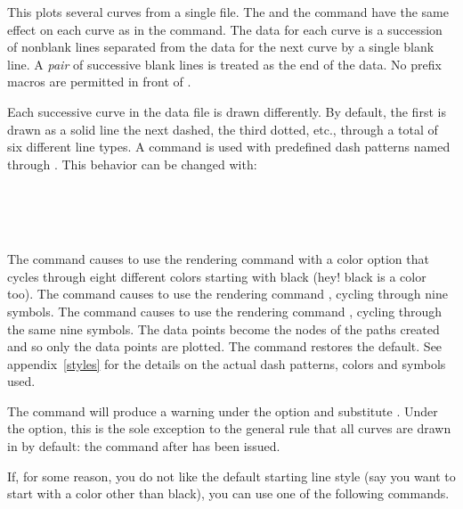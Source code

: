 \documentclass[letterpaper]{article}
\begin{document}
This plots several curves from a single file. The  and the
command  have the same effect on each curve as in the
 command. The data for each curve is a succession of
nonblank lines separated from the data for the next curve by a single
blank line. A \emph{pair} of successive blank lines is treated as the
end of the data. No prefix macros are permitted in front of
.

Each successive curve in the data file is drawn differently. By default,
the first is drawn as a solid line the next dashed, the third dotted,
etc., through a total of six different line types. A 
command is used with predefined dash patterns named 
through . This behavior can be changed with:

\begin{cd}
\\
\\
\\
%
%
%
%
\end{cd}

The command  causes  to use the rendering
command  with a color option that cycles through eight
different colors starting with black (hey! black is a color too). The
command  causes  to use the rendering
command , cycling through nine symbols. The command
 causes  to use the rendering command
, cycling through the same nine symbols. The data points
become the nodes of the paths created and so only the data points are
plotted. The command  restores the default. See
appendix~\ref{styles} for the details on the actual dash patterns,
colors and symbols used.

The command  will produce a warning under the
 option and substitute . Under the
 option, this is the sole exception to the general rule
that all curves are drawn in  by default: the
 command after  has been issued.

If, for some reason, you do not like the default starting line style
(say you want to start with a color other than black), you can use one
of the following commands.
\end{document}
